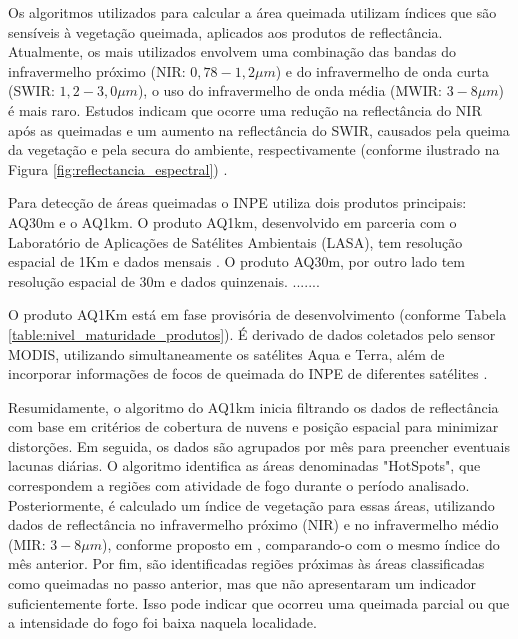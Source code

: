 \documentclass[cic,tc]{iiufrgs}
\begin{document}
Os algoritmos utilizados para calcular a área queimada utilizam índices que são sensíveis à vegetação queimada, aplicados aos produtos de reflectância. Atualmente, os mais utilizados envolvem uma combinação das bandas do infravermelho próximo (NIR: $0,78-1,2\mu m$) e do infravermelho de onda curta (SWIR: $1,2-3,0\mu m$), o uso do infravermelho de onda média (MWIR: $3-8 \mu m$) é mais raro. Estudos indicam que ocorre uma redução na reflectância do NIR após as queimadas e um aumento na reflectância do SWIR, causados pela queima da vegetação e pela secura do ambiente, respectivamente (conforme ilustrado na Figura \ref{fig:reflectancia_espectral}) \citep{CHUVIECO201945}.


Para detecção de áreas queimadas o INPE utiliza dois produtos principais: AQ30m e o AQ1km. O produto AQ1km, desenvolvido em parceria com o Laboratório de Aplicações de Satélites Ambientais (LASA), tem resolução espacial de 1Km e dados mensais \citep{SiteAQ1km}. O produto AQ30m, por outro lado tem resolução espacial de 30m e dados quinzenais. ....... 

O produto AQ1Km está em fase provisória de desenvolvimento (conforme Tabela \ref{table:nivel_maturidade_produtos}). É derivado de dados coletados pelo sensor MODIS, utilizando simultaneamente os satélites Aqua e Terra, além de incorporar informações de focos de queimada do INPE de diferentes satélites \citep{libonati2015algorithm}. 

Resumidamente, o algoritmo do AQ1km inicia filtrando os dados de reflectância com base em critérios de cobertura de nuvens e posição espacial para minimizar distorções. Em seguida, os dados são agrupados por mês para preencher eventuais lacunas diárias. O algoritmo identifica as áreas denominadas "HotSpots", que correspondem a regiões com atividade de fogo durante o período analisado. Posteriormente, é calculado um índice de vegetação para essas áreas, utilizando dados de reflectância no infravermelho próximo (NIR) e no infravermelho médio (MIR: $3-8 \mu m$), conforme proposto em \citet{libonati2011}, comparando-o com o mesmo índice do mês anterior. Por fim, são identificadas regiões próximas às áreas classificadas como queimadas no passo anterior, mas que não apresentaram um indicador suficientemente forte. Isso pode indicar que ocorreu uma queimada parcial ou que a intensidade do fogo foi baixa naquela localidade.
\end{document}
